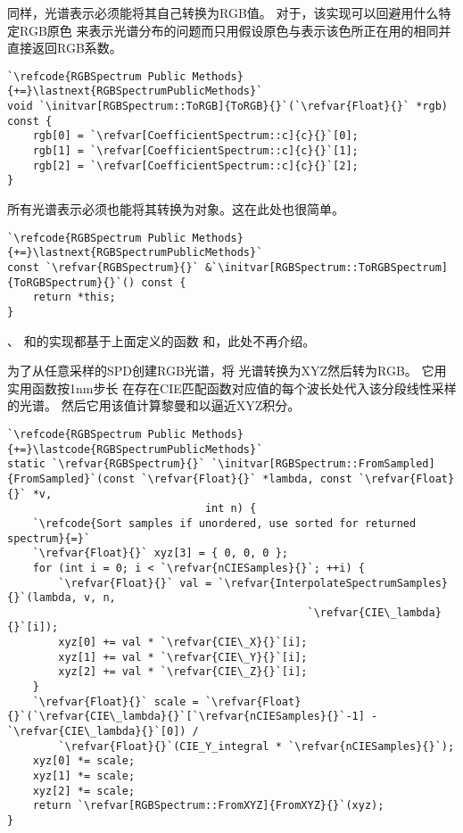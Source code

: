 同样，光谱表示必须能将其自己转换为RGB值。
对于，该实现可以回避用什么特定RGB原色
来表示光谱分布的问题而只用假设原色与表示该色所正在用的相同并直接返回RGB系数。
\begin{lstlisting}
`\refcode{RGBSpectrum Public Methods}{+=}\lastnext{RGBSpectrumPublicMethods}`
void `\initvar[RGBSpectrum::ToRGB]{ToRGB}{}`(`\refvar{Float}{}` *rgb) const {
    rgb[0] = `\refvar[CoefficientSpectrum::c]{c}{}`[0];
    rgb[1] = `\refvar[CoefficientSpectrum::c]{c}{}`[1];
    rgb[2] = `\refvar[CoefficientSpectrum::c]{c}{}`[2];
}
\end{lstlisting}

所有光谱表示必须也能将其转换为对象。这在此处也很简单。
\begin{lstlisting}
`\refcode{RGBSpectrum Public Methods}{+=}\lastnext{RGBSpectrumPublicMethods}`
const `\refvar{RGBSpectrum}{}` &`\initvar[RGBSpectrum::ToRGBSpectrum]{ToRGBSpectrum}{}`() const {
    return *this;
}
\end{lstlisting}

{}、{}
和{}的实现都基于上面定义的函数
和，此处不再介绍。

为了从任意采样的SPD创建RGB光谱，将
光谱转换为XYZ然后转为RGB。
它用实用函数按1nm步长
在存在CIE匹配函数对应值的每个波长处代入该分段线性采样的光谱。
然后它用该值计算黎曼和以逼近XYZ积分。
\begin{lstlisting}
`\refcode{RGBSpectrum Public Methods}{+=}\lastcode{RGBSpectrumPublicMethods}`
static `\refvar{RGBSpectrum}{}` `\initvar[RGBSpectrum::FromSampled]{FromSampled}`(const `\refvar{Float}{}` *lambda, const `\refvar{Float}{}` *v,
                               int n) {
    `\refcode{Sort samples if unordered, use sorted for returned spectrum}{=}`
    `\refvar{Float}{}` xyz[3] = { 0, 0, 0 };
    for (int i = 0; i < `\refvar{nCIESamples}{}`; ++i) {
        `\refvar{Float}{}` val = `\refvar{InterpolateSpectrumSamples}{}`(lambda, v, n,
                                               `\refvar{CIE\_lambda}{}`[i]);
        xyz[0] += val * `\refvar{CIE\_X}{}`[i];
        xyz[1] += val * `\refvar{CIE\_Y}{}`[i];
        xyz[2] += val * `\refvar{CIE\_Z}{}`[i];
    }
    `\refvar{Float}{}` scale = `\refvar{Float}{}`(`\refvar{CIE\_lambda}{}`[`\refvar{nCIESamples}{}`-1] - `\refvar{CIE\_lambda}{}`[0]) /
        `\refvar{Float}{}`(CIE_Y_integral * `\refvar{nCIESamples}{}`);
    xyz[0] *= scale;
    xyz[1] *= scale;
    xyz[2] *= scale;
    return `\refvar[RGBSpectrum::FromXYZ]{FromXYZ}{}`(xyz);    
}
\end{lstlisting}

